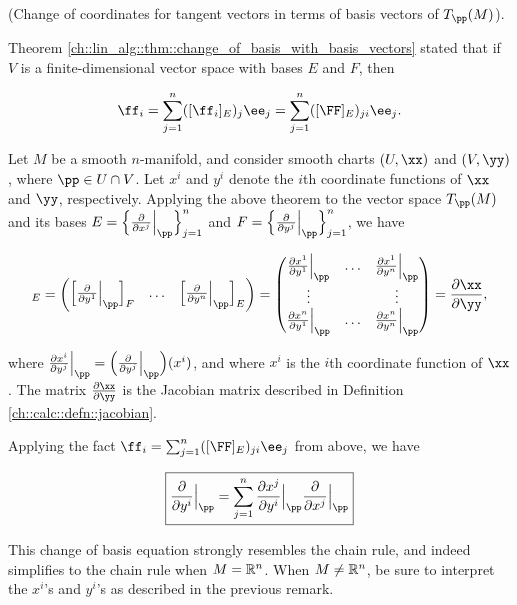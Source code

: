 \begin{theorem}
    (Change of coordinates for tangent vectors in terms of basis vectors of $T_\pp(M)$).

    Theorem \ref{ch::lin_alg::thm::change_of_basis_with_basis_vectors} stated that if $V$ is a finite-dimensional vector space with bases $E$ and $F$, then

    \begin{align*}
        \ff_i = \sum_{j = 1}^n ([\ff_i]_E)_j \ee_j = \sum_{j = 1}^n ([\FF]_E)_{ji} \ee_j.
    \end{align*}

    Let $M$ be a smooth $n$-manifold, and consider smooth charts $(U, \xx)$ and $(V, \yy)$, where $\pp \in U \cap V$. Let $x^i$ and $y^i$ denote the $i$th coordinate functions of $\xx$ and $\yy$, respectively. Applying the above theorem to the vector space $T_\pp(M)$ and its bases $E = \Big\{\frac{\pd}{\pd x^j}\Big|_\pp \Big\}_{j = 1}^n$ and $F = \Big\{\frac{\pd}{\pd y^j}\Big|_\pp \Big\}_{j = 1}^n$, we have
    
    \begin{align*}
        [\FF]_E
        = \begin{pmatrix} \Big[\frac{\pd}{\pd y^1}\Big|_\pp\Big]_F & \hdots & \Big[\frac{\pd}{\pd y^n}\Big|_\pp\Big]_E \end{pmatrix}
        = \begin{pmatrix}
            \frac{\pd x^1}{\pd y^1}\Big|_\pp & \hdots & \frac{\pd x^1}{\pd y^n}\Big|_\pp \\
            \vdots & & \vdots \\
            \frac{\pd x^n}{\pd y^1}\Big|_\pp & \hdots & \frac{\pd x^n}{\pd y^n}\Big|_\pp
        \end{pmatrix}
        = \frac{\pd \xx}{\pd \yy},
    \end{align*}
    
    where $\frac{\pd x^i}{\pd y^j}\Big|_\pp = \Big( \frac{\pd}{\pd y^j}\Big|_\pp \Big) (x^i)$, and where $x^i$ is the $i$th coordinate function of $\xx$. The matrix $\frac{\pd \xx}{\pd \yy}$ is the Jacobian matrix described in Definition \ref{ch::calc::defn::jacobian}.
    
    Applying the fact $\ff_i = \sum_{j = 1}^n ([\FF]_E)_{ji} \ee_j$ from above, we have
    
    \begin{align*}
        \boxed
        {
            \frac{\pd}{\pd y^i}\Big|_\pp
            =
            \sum_{j = 1}^n \frac{\pd x^j}{\pd y^i}\Big|_\pp \frac{\pd}{\pd x^j}\Big|_\pp
        }
    \end{align*}
    
    This change of basis equation strongly resembles the chain rule, and indeed simplifies to the chain rule when $M = \mathbb{R}^n$. When $M \neq \mathbb{R}^n$, be sure to interpret the $x^i$'s and $y^i$'s as described in the previous remark.
\end{theorem}

